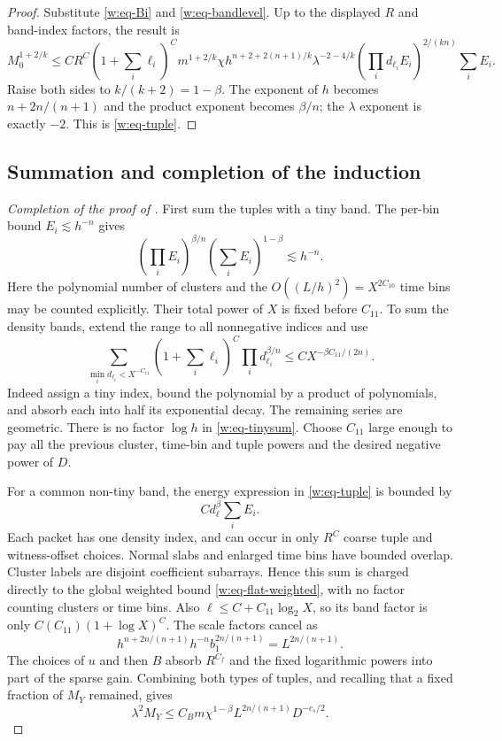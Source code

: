 \begin{proof}
Substitute \eqref{w:eq-Bi} and \eqref{w:eq-bandlevel}.  Up to the
displayed $R$ and band-index factors, the result is
\[
 M_0^{1+2/k}\leq C R^C(1+\textstyle\sum_i\ell_i)^C
 m^{1+2/k}\chi
 h^{n+2+2(n+1)/k}\lambda^{-2-4/k}
 \left(\prod_i d_{\ell_i}E_i\right)^{2/(kn)}\sum_iE_i.
\]
Raise both sides to $k/(k+2)=1-\beta$.  The exponent of $h$ becomes
$n+2n/(n+1)$ and the product exponent becomes $\beta/n$; the
$\lambda$ exponent is exactly $-2$.  This is
\eqref{w:eq-tuple}.
\end{proof}

\subsection{Summation and completion of the induction}

\begin{proof}[Completion of the proof of ]
First sum the tuples with a tiny band.  The per-bin bound
$E_i\lesssim h^{-n}$ gives
\[
 \left(\prod_i E_i\right)^{\beta/n}
 \left(\sum_iE_i\right)^{1-\beta}\lesssim h^{-n}.
\]
Here the polynomial number of clusters and the
$O((L/h)^2)=X^{2C_{10}}$ time bins may be counted explicitly.  Their
total power of $X$ is fixed before $C_{11}$.  To sum the density bands,
extend the range to all nonnegative indices and use
\begin{equation}\label{w:eq-tinysum}
 \sum_{\min_i d_{\ell_i}<X^{-C_{11}}}
 (1+\textstyle\sum_i\ell_i)^C\prod_i d_{\ell_i}^{\beta/n}
 \leq C X^{-\beta C_{11}/(2n)}.
\end{equation}
Indeed assign a tiny index, bound the polynomial by a product of
polynomials, and absorb each into half its exponential decay.  The
remaining series are geometric.  There is no factor $\log h$ in
\eqref{w:eq-tinysum}.  Choose $C_{11}$ large enough to pay all the
previous cluster, time-bin and tuple powers and the desired negative
power of $D$.

For a common non-tiny band, the energy expression in
\eqref{w:eq-tuple} is bounded by
\[
 C d_\ell^\beta\sum_i E_i.
\]
Each packet has one density index, and can occur in only $R^C$ coarse
tuple and witness-offset choices.  Normal slabs and enlarged time
bins have bounded overlap.  Cluster labels are disjoint coefficient
subarrays.  Hence this sum is charged directly to the global weighted
bound \eqref{w:eq-flat-weighted}, with no factor counting clusters or
time bins.  Also
$\ell\leq C+C_{11}\log_2X$, so its band factor is only
$C(C_{11})(1+\log X)^C$.  The scale factors cancel as
\[
 h^{n+2n/(n+1)}h^{-n}b_1^{2n/(n+1)}
 =L^{2n/(n+1)}.
\]
The choices of $u$ and then $B$ absorb $R^{C_f}$ and the fixed
logarithmic powers into part of the sparse gain.  Combining both
types of tuples, and recalling that a fixed fraction of $M_Y$ remained,
gives
\begin{equation}\label{w:eq-finalL2}
 \lambda^2M_Y\leq C_Bm\chi^{1-\beta}
                   L^{2n/(n+1)}D^{-c_s/2}.
\end{equation}


\end{proof}
